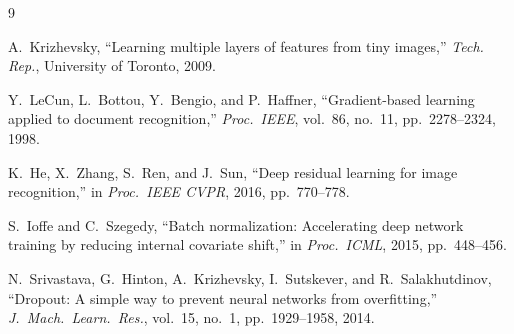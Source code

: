 \documentclass[conference]{IEEEtran}
\begin{document}

\begin{thebibliography}{9}

A.~Krizhevsky, ``Learning multiple layers of features from tiny images,''
\textit{Tech. Rep.}, University of Toronto, 2009.

Y.~LeCun, L.~Bottou, Y.~Bengio, and P.~Haffner,
``Gradient-based learning applied to document recognition,''
\textit{Proc.\ IEEE}, vol.~86, no.~11, pp.~2278--2324, 1998.

K.~He, X.~Zhang, S.~Ren, and J.~Sun,
``Deep residual learning for image recognition,''
in \textit{Proc.\ IEEE CVPR}, 2016, pp.~770--778.

S.~Ioffe and C.~Szegedy,
``Batch normalization: Accelerating deep network training by reducing
internal covariate shift,''
in \textit{Proc.\ ICML}, 2015, pp.~448--456.

N.~Srivastava, G.~Hinton, A.~Krizhevsky, I.~Sutskever, and R.~Salakhutdinov,
``Dropout: A simple way to prevent neural networks from overfitting,''
\textit{J.\ Mach.\ Learn.\ Res.}, vol.~15, no.~1, pp.~1929--1958, 2014.

\end{thebibliography}
\end{document}
